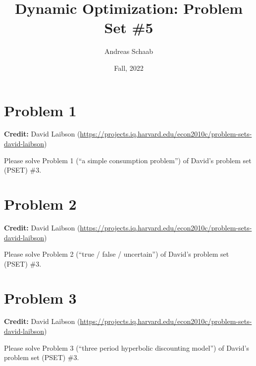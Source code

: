 \documentclass[11pt]{extarticle}
\title{Dynamic Optimization: Problem Set \#5}
\author{Andreas Schaab}
\date{Fall, 2022}
\theoremstyle{plain}
\theoremstyle{definition}
\begin{document}
\maketitle
\thispagestyle{empty}
\setcounter{page}{0}



\vspace{10mm}
\section*{Problem 1}

\textbf{Credit:} David Laibson (\url{https://projects.iq.harvard.edu/econ2010c/problem-sets-david-laibson})

Please solve Problem 1 (``a simple consumption problem'') of David's problem set (PSET) \#3.



\vspace{10mm}
\section*{Problem 2}

\textbf{Credit:} David Laibson (\url{https://projects.iq.harvard.edu/econ2010c/problem-sets-david-laibson})

Please solve Problem 2 (``true / false / uncertain'') of David's problem set (PSET) \#3.



\vspace{10mm}
\section*{Problem 3}

\textbf{Credit:} David Laibson (\url{https://projects.iq.harvard.edu/econ2010c/problem-sets-david-laibson})

Please solve Problem 3 (``three period hyperbolic discounting model'') of David's problem set (PSET) \#3.



\vspace{10mm}
\end{document}

